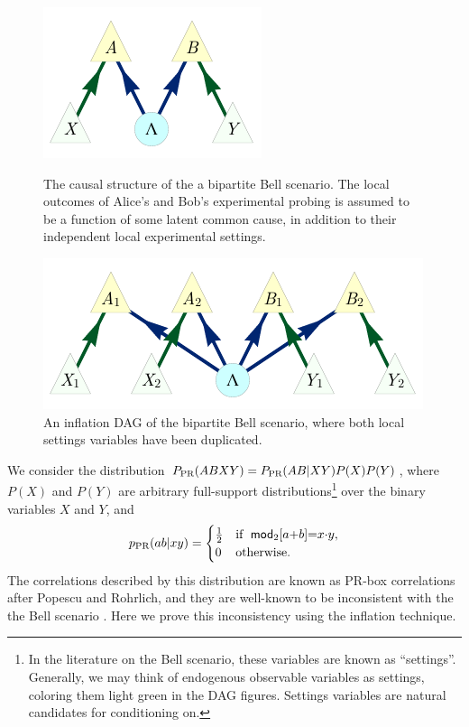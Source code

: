 \begin{figure}[ht]
\centering
\begin{minipage}[t]{0.45\linewidth}
\centering
\includegraphics[scale=1]{BellDagRaw.pdf}
\caption{The causal structure of the a bipartite Bell scenario. The local outcomes of Alice's and Bob's experimental probing is assumed to be a function of some latent common cause, in addition to their independent local experimental settings.}\label{fig:NewBellDAG1}
\end{minipage}
\hfill
\begin{minipage}[t]{0.45\linewidth}
\centering
\includegraphics[scale=1]{BellDagCopy.pdf}
\caption{An inflation DAG of the bipartite Bell scenario, where both local settings variables have been duplicated.}\label{fig:BellDagCopy1}
\end{minipage}
\end{figure}


We consider the distribution ${P_{\text{PR}}}\parenths{A B X Y} = P_{\text{PR}}\parenths{A B | X Y} P(X) P(Y)$, where $P(X)$ and $P(Y)$ are arbitrary full-support distributions\footnote{In the literature on the Bell scenario, these variables are known as ``settings''. Generally, we may think of endogenous observable variables as settings, coloring them light green in the DAG figures. Settings variables are natural candidates for conditioning on.} over the binary variables $X$ and $Y$, and
\begin{align}\begin{split}\label{eq:PRbox}
p_{\text{PR}}\parens{a b |x y}=\begin{cases}\tfrac{1}{2}&\text{if }\; \SmallNamedFunction[2]{mod}{a\cramp{+}b}\eql x\cramp{\cdot} y, \\ 0&\text{otherwise}.\end{cases}
\end{split}\end{align}
The correlations described by this distribution are known as PR-box correlations after Popescu and Rohrlich, and they are well-known to be inconsistent with the the Bell scenario \cite{PROriginal,PRUnit}. Here we prove this inconsistency using the inflation technique. 

